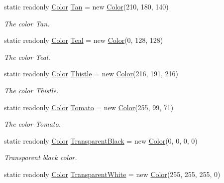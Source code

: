 \begin{DoxyCompactItemize}
static readonly \hyperlink{struct_tri_devs_1_1_tri_engine2_d_1_1_color}{Color} \hyperlink{struct_tri_devs_1_1_tri_engine2_d_1_1_color_a8881c641f295417f78fbcd1b3f04038c}{Tan} = new \hyperlink{struct_tri_devs_1_1_tri_engine2_d_1_1_color}{Color}(210, 180, 140)
\begin{DoxyCompactList}\small\item\em The color Tan. \end{DoxyCompactList}\item 
static readonly \hyperlink{struct_tri_devs_1_1_tri_engine2_d_1_1_color}{Color} \hyperlink{struct_tri_devs_1_1_tri_engine2_d_1_1_color_a87bf44a15cb6a0295997984da16b58ca}{Teal} = new \hyperlink{struct_tri_devs_1_1_tri_engine2_d_1_1_color}{Color}(0, 128, 128)
\begin{DoxyCompactList}\small\item\em The color Teal. \end{DoxyCompactList}\item 
static readonly \hyperlink{struct_tri_devs_1_1_tri_engine2_d_1_1_color}{Color} \hyperlink{struct_tri_devs_1_1_tri_engine2_d_1_1_color_a689be45b11842d69956123fd41044157}{Thistle} = new \hyperlink{struct_tri_devs_1_1_tri_engine2_d_1_1_color}{Color}(216, 191, 216)
\begin{DoxyCompactList}\small\item\em The color Thistle. \end{DoxyCompactList}\item 
static readonly \hyperlink{struct_tri_devs_1_1_tri_engine2_d_1_1_color}{Color} \hyperlink{struct_tri_devs_1_1_tri_engine2_d_1_1_color_aac28de6c8573d9b47ec0fb4dc6c6ee43}{Tomato} = new \hyperlink{struct_tri_devs_1_1_tri_engine2_d_1_1_color}{Color}(255, 99, 71)
\begin{DoxyCompactList}\small\item\em The color Tomato. \end{DoxyCompactList}\item 
static readonly \hyperlink{struct_tri_devs_1_1_tri_engine2_d_1_1_color}{Color} \hyperlink{struct_tri_devs_1_1_tri_engine2_d_1_1_color_aa4b89fdc2c8f9165421cc213e766a333}{Transparent\-Black} = new \hyperlink{struct_tri_devs_1_1_tri_engine2_d_1_1_color}{Color}(0, 0, 0, 0)
\begin{DoxyCompactList}\small\item\em Transparent black color. \end{DoxyCompactList}\item 
static readonly \hyperlink{struct_tri_devs_1_1_tri_engine2_d_1_1_color}{Color} \hyperlink{struct_tri_devs_1_1_tri_engine2_d_1_1_color_ab807ae74612c7561f4408b976180de37}{Transparent\-White} = new \hyperlink{struct_tri_devs_1_1_tri_engine2_d_1_1_color}{Color}(255, 255, 255, 0)

\end{DoxyCompactItemize}
